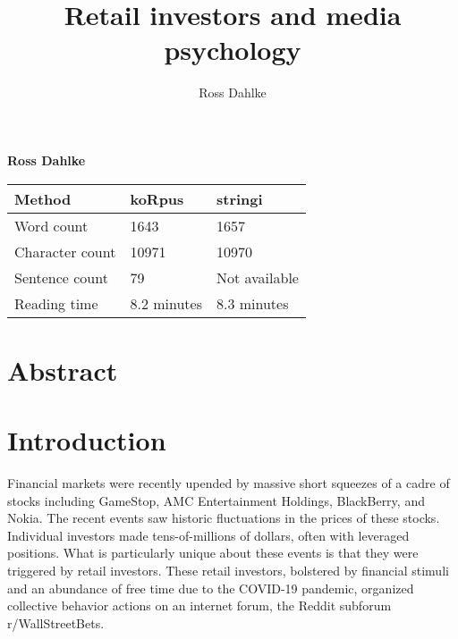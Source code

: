 \documentclass[12pt,]{article}
\title{Retail investors and media psychology  }
\author{\Large Ross Dahlke\vspace{0.05in} \newline\normalsize\emph{}  }
\date{}
\newcommand*{\authorfont}{\fontfamily{phv}\selectfont}
\begin{document}
	
%

{%
\setlength{\parindent}{0pt}
\thispagestyle{plain}
{\fontsize{18}{20}\selectfont\raggedright 
\maketitle  %

}

{
   \vskip 13.5pt\relax \normalsize\fontsize{11}{12} 
\textbf{\authorfont Ross Dahlke} \hskip 15pt \emph{\small }   

}

}






\vskip -8.5pt



\noindent \doublespacing 

\begin{longtable}[]{@{}lll@{}}
\toprule
Method & koRpus & stringi\tabularnewline
\midrule
\endhead
Word count & 1643 & 1657\tabularnewline
Character count & 10971 & 10970\tabularnewline
Sentence count & 79 & Not available\tabularnewline
Reading time & 8.2 minutes & 8.3 minutes\tabularnewline
\bottomrule
\end{longtable}

\hypertarget{abstract}{%
\section{Abstract}\label{abstract}}

\hypertarget{introduction}{%
\section{Introduction}\label{introduction}}

Financial markets were recently upended by massive short squeezes of a
cadre of stocks including GameStop, AMC Entertainment Holdings,
BlackBerry, and Nokia. The recent events saw historic fluctuations in
the prices of these stocks. Individual investors made tens-of-millions
of dollars, often with leveraged positions. What is particularly unique
about these events is that they were triggered by retail investors.
These retail investors, bolstered by financial stimuli and an abundance
of free time due to the COVID-19 pandemic, organized collective behavior
actions on an internet forum, the Reddit subforum r/WallStreetBets.
\end{document}
